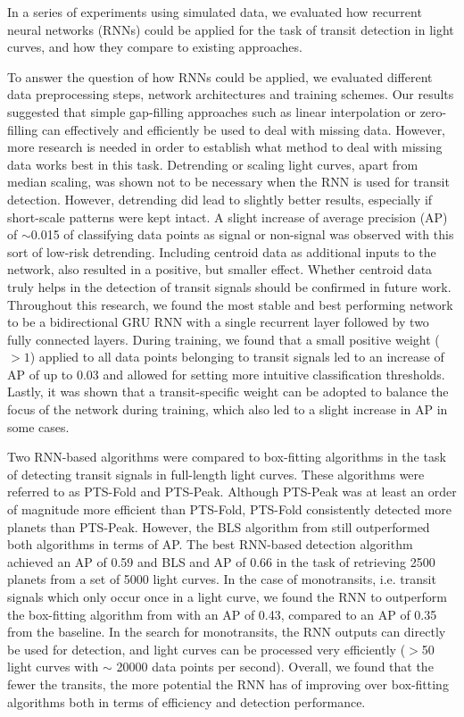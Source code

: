 
In a series of experiments using simulated data, we evaluated how recurrent neural networks (RNNs) could be applied for the task of transit detection in light curves, and how they compare to existing approaches. 

To answer the question of how RNNs could be applied, we evaluated different data preprocessing steps, network architectures and training schemes. Our results suggested that simple gap-filling approaches such as linear interpolation or zero-filling can effectively and efficiently be used to deal with missing data. However, more research is needed in order to establish what method to deal with missing data works best in this task. Detrending or scaling light curves, apart from median scaling, was shown not to be necessary when the RNN is used for transit detection. However, detrending did lead to slightly better results, especially if short-scale patterns were kept intact. A slight increase of average precision (AP) of $\sim$0.015 of classifying data points as signal or non-signal was observed with this sort of low-risk detrending. Including centroid data as additional inputs to the network, also resulted in a positive, but smaller effect. Whether centroid data truly helps in the detection of transit signals should be confirmed in future work. Throughout this research, we found the most stable and best performing network to be a bidirectional GRU RNN with a single recurrent layer followed by two fully connected layers.  During training, we found that a small positive weight ($>1$) applied to all data points belonging to transit signals led to an increase of AP of up to 0.03 and allowed for setting more intuitive classification thresholds. Lastly, it was shown that a transit-specific weight can be adopted to balance the focus of the network during training, which also led to a slight increase in AP in some cases.

Two RNN-based algorithms were compared to box-fitting algorithms in the task of detecting transit signals in full-length light curves. These algorithms were referred to as PTS-Fold and PTS-Peak. Although PTS-Peak was at least an order of magnitude more efficient than PTS-Fold, PTS-Fold consistently detected more planets than PTS-Peak. However, the BLS algorithm from \cite{kovacs2002box} still outperformed both algorithms in terms of AP. The best RNN-based detection algorithm achieved an AP of 0.59 and BLS and AP of 0.66 in the task of retrieving 2500 planets from a set of 5000 light curves.  In the case of monotransits, i.e. transit signals which only occur once in a light curve, we found the RNN to outperform the box-fitting algorithm from \cite{foreman2016population} with an AP of 0.43, compared to an AP of 0.35 from the baseline. In the search for monotransits, the RNN outputs can directly be used for detection, and light curves can be processed very efficiently ($>$50 light curves with $\sim$ 20000 data points per second). Overall, we found that the fewer the transits, the more potential the RNN has of improving over box-fitting algorithms both in terms of efficiency and detection performance.

